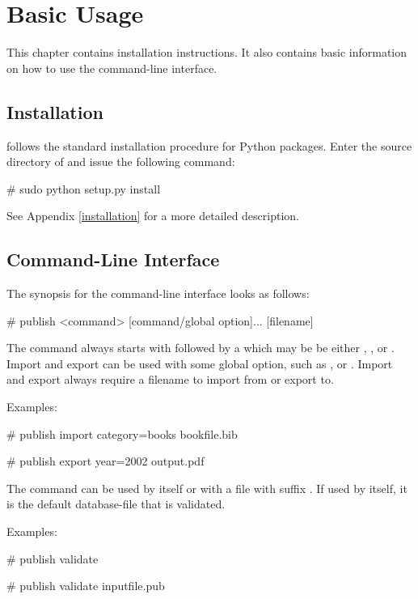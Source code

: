 \chapter{Basic Usage}

This chapter contains installation instructions. It
also contains basic information on how to use the command-line
interface.

\section{Installation}
\package{} follows the standard installation procedure for Python packages.
Enter the source directory of \package{} and issue the following command:
\begin{code}
# sudo python setup.py install
\end{code}

See Appendix \ref{installation} for a more detailed description.

\section{Command-Line Interface}

The synopsis for the \package{} command-line interface looks as follows:

\begin{code}
# publish <command> [command/global option]... [filename]
\end{code}

The command always starts with  followed by a
 which may be be either , ,
or . Import and export can be used with some global
option, such as , or
. Import and export always require
a filename to import from or export to.

Examples:

\begin{code}
# publish import category=books bookfile.bib

# publish export year=2002 output.pdf
\end{code}

The command  can be used by itself or with a file with
suffix . If used by itself, it is the default database-file
 that is validated.

Examples:

\begin{code}
# publish validate

# publish validate inputfile.pub
\end{code}

